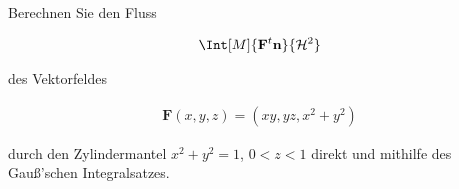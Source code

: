 
\begin{exercise}

Berechnen Sie den Fluss

\begin{align*}
    \Int[M]
    {
        \mathbf F^t \mathbf n
    }{
        \mathcal H^2
    }
\end{align*}

des Vektorfeldes

\begin{align*}
    \mathbf F(x, y, z)
    =
    (x y, y z, x^2 + y^2)
\end{align*}

durch den Zylindermantel $x^2 + y^2 = 1$, $0 < z < 1$ direkt und mithilfe des Gauß'schen Integralsatzes.

\end{exercise}


